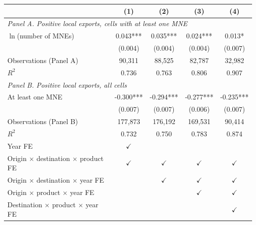 \begin{tabular}{l*{4}{c}}
\toprule
 & (1) & (2) & (3) & (4) \\
\midrule
\multicolumn{5}{l}{\textit{Panel A. Positive local exports, cells with at least one MNE}} \\
$\ln$(number of MNEs) & 0.043*** & 0.035*** & 0.024*** & 0.013* \\
 & (0.004) & (0.004) & (0.004) & (0.007) \\
Observations (Panel A) & 90,311 & 88,525 & 82,787 & 32,982 \\
$R^2$ & 0.736 & 0.763 & 0.806 & 0.907 \\
\midrule
\multicolumn{5}{l}{\textit{Panel B. Positive local exports, all cells}} \\
At least one MNE & -0.300*** & -0.294*** & -0.277*** & -0.235*** \\
 & (0.007) & (0.007) & (0.006) & (0.007) \\
Observations (Panel B) & 177,873 & 176,192 & 169,531 & 90,414 \\
$R^2$ & 0.732 & 0.750 & 0.783 & 0.874 \\
\midrule
Year FE & $\checkmark$ &  &  &  \\
Origin $\times$ destination $\times$ product FE & $\checkmark$ & $\checkmark$ & $\checkmark$ & $\checkmark$ \\
Origin $\times$ destination $\times$ year FE &  & $\checkmark$ & $\checkmark$ & $\checkmark$ \\
Origin $\times$ product $\times$ year FE &  &  & $\checkmark$ & $\checkmark$ \\
Destination $\times$ product $\times$ year FE &  &  &  & $\checkmark$ \\
\bottomrule
\end{tabular}
